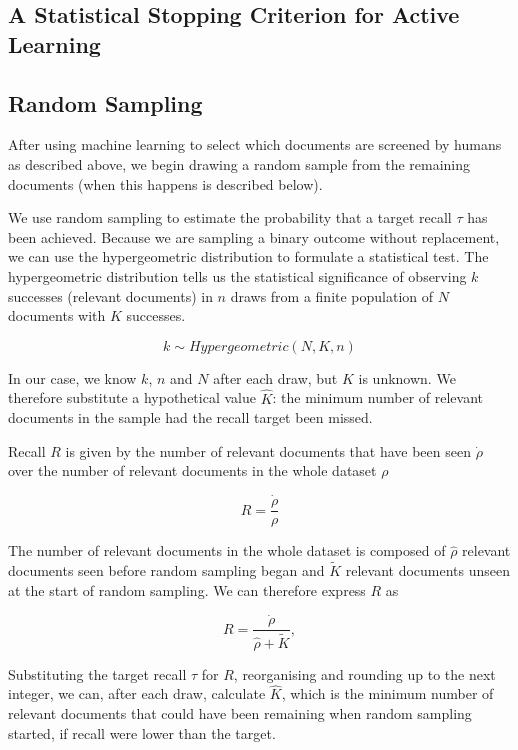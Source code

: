 \documentclass{bmcart}
\begin{document}
\subsection*{A Statistical Stopping Criterion for Active Learning}

	\subsection*{Random Sampling}
	
	After using machine learning to select which documents are screened by humans as described above, we begin drawing a random sample from the remaining documents (when this happens is described below). 

	We use random sampling to estimate the probability that a target recall $\tau$ has been achieved. Because we are sampling a binary outcome without replacement, we can use the hypergeometric distribution to formulate a statistical test. The hypergeometric distribution tells us the statistical significance of observing $k$ successes (relevant documents) in $n$ draws from a finite population of $N$ documents with $K$ successes. 
	
	\begin{equation}
		k \sim Hypergeometric(N, K, n)
	\end{equation}
	
	In our case, we know $k$, $n$ and $N$ after each draw, but $K$ is unknown. We therefore substitute a hypothetical value $\hat{K}$: the minimum number of relevant documents in the sample had the recall target been missed.
	
	Recall $R$ is given by the number of relevant documents that have been seen $\dot{\rho}$ over the number of relevant documents in the whole dataset $\rho$
	
	\begin{equation}
		R = \frac{\dot{\rho}}{\rho}
	\end{equation}
	
	The number of relevant documents in the whole dataset is composed of $\hat{\rho}$ relevant documents seen before random sampling began and $\tilde{K}$ relevant documents unseen at the start of random sampling. We can therefore express $R$ as
	
	\begin{equation}
		R = \frac{\dot{\rho}}{\hat{\rho} + \tilde{K}},
	\end{equation}
	
	Substituting the target recall $\tau$ for $R$, reorganising and rounding up to the next integer, we can, after each draw, calculate $\hat{K}$, which is the minimum number of relevant documents that could have been remaining when random sampling started, if recall were lower than the target.
	
\end{document}
